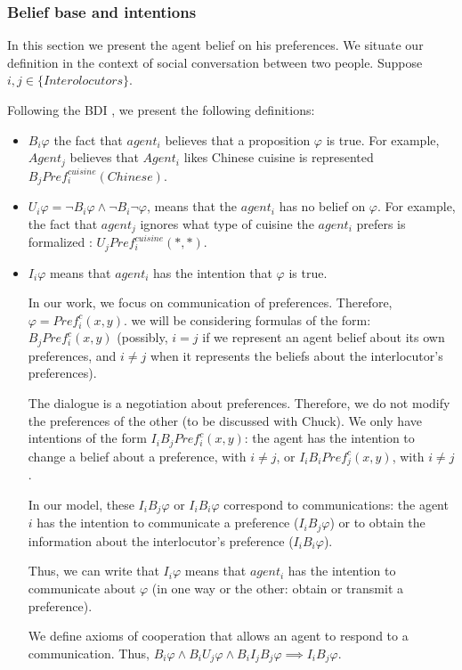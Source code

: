 \documentclass{llncs}
\begin{document}
\subsubsection{Belief base and intentions}
In this section we present the agent belief on his preferences. We situate our definition in the context of social conversation between two people. Suppose $i,j \in \{Interolocutors\}$.
\par Following the BDI \cite{rao1991modeling}, we present the following definitions:
\begin{itemize}
	\item  $ B_{i} \varphi$ the fact that $agent_{i}$  believes that a proposition $\varphi$ is true. For example, $Agent_j$ believes that $Agent_{i}$ likes Chinese cuisine is represented $ B_{j} Pref_{i}^{cuisine}(Chinese)$.
	\item  $U_{i} \varphi = \neg B_{i} \varphi \land \neg B_{i} \neg \varphi$, means that the $agent_{i}$ has no belief on $\varphi$.  For example, the fact that $agent_{j}$ ignores what type of cuisine the $agent_{i}$ prefers is formalized : $U_{j} Pref_{i}^{cuisine}(*,*)$.
	\item $I_{i} \varphi$ means that  $agent_i$ has the intention that $\varphi$ is true.

	In our work, we focus on communication of preferences. Therefore, $\varphi = Pref_i^c(x,y)$. we will be considering formulas of the form: $B_j Pref_i^c(x,y)$ (possibly, $i=j$ if we represent an agent belief about its own preferences, and $i\neq j$ when it represents the beliefs about the interlocutor's preferences).
	
	The dialogue is a negotiation about preferences. Therefore, we do not modify the preferences of the other (to be discussed with Chuck). We only have intentions of the form $I_i B_j Pref_i^c(x,y)$: the agent has the intention to change a belief about a preference, with $i\neq j$, or $I_i B_i Pref_j^c(x,y)$, with $i\neq j$.
	
	In our model, these $I_i B_j \varphi$ or $I_i B_i \varphi$ correspond to communications: the agent $i$ has the intention to communicate a preference ($I_i B_j \varphi$) or to obtain the information about the interlocutor's preference ($I_i B_i \varphi$). 
	
	Thus, we can write that $I_{i} \varphi$ means that  $agent_i$ has the intention to communicate about $\varphi$ (in one way or the other: obtain or transmit a preference).
	
	We define axioms of cooperation that allows an agent to respond to a communication. Thus, $ B_{i} \varphi \land  B_{i} U_{j} \varphi \land  B_{i} I_{j}  B_{j} \varphi \implies I_{i}  B_{j} \varphi  $.


\end{itemize}
\end{document}
